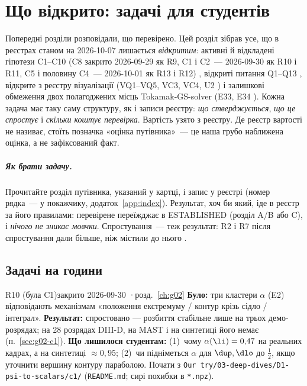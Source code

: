 \chapter{Що відкрито: задачі для студентів}\label{ch:g10}

Попередні розділи розповідали, що перевірено. Цей розділ зібрав усе, що в реєстрах станом на
2026-10-07 лишається \emph{відкритим}: активні й відкладені гіпотези C1--C10 (C8 закрито 2026-09-29 як R9, C1 і C2~--- 2026-09-30 як R10 і R11, C5 і половину C4~--- 2026-10-01 як R13 і R12) \cite{RegConj},
відкриті питання Q1--Q13 \cite{RegQ}, відкрите з реєстру візуалізації (VQ1--VQ5, VC3, VC4,
U2 \cite{RegViz}) і залишкові обмеження двох полагоджених місць Tokamak-GS-solver (E33, E34
\cite{RegEst}). Кожна задача має таку саму структуру, як і записи реєстру: \emph{що стверджується},
\emph{що це спростує} і \emph{скільки коштує перевірка}. Вартість узято з реєстру. Де реєстр
вартості не називає, стоїть позначка «оцінка путівника»~--- це наша грубо наближена оцінка, а
не зафіксований факт.

\paragraph{Як брати задачу.} Прочитайте розділ путівника, указаний у картці, і запис у реєстрі
(номер рядка~--- у покажчику, додаток~\ref{app:index}). Результат, хоч би який, іде в реєстр за
його правилами: перевірене переїжджає в ESTABLISHED (розділ A/B або C), і \emph{нічого не
зникає мовчки}. Спростування~--- теж результат: R2 і R7 після спростування дали більше, ніж
містили до нього \cite{RegConj}.

\section{Задачі на години}\label{sec:g10-hours}

\begin{itemcard}{R10 (була C1)}{закрито 2026-09-30 \quad·\quad розд.~\ref{ch:g02}}
\textbf{Було:} три кластери $\alpha$ (E2) відповідають механізмам «положення екстремуму / контур
крізь сідло / інтеграл». \textbf{Результат:} спростовано --- розбиття стабільне лише на трьох
демо-розрядах; на 28 розрядах DIII-D, на MAST і на синтетиці його немає (п.~\ref{sec:g02-c1}).
\textbf{Що лишилося студентам:} (1)~чому $\alpha(\li)=0{,}47$ на реальних кадрах, а на
синтетиці $\approx0{,}95$; (2)~чи підніметься $\alpha$ для $\dup,\dlo$ до $\tfrac12$, якщо
уточнити вершину контуру параболою. Почати з
\texttt{Our try/03-deep-dives/D1-psi-to-scalars/c1/} (\texttt{README.md}; сирі похибки в \texttt{*.npz}).
\end{itemcard}

